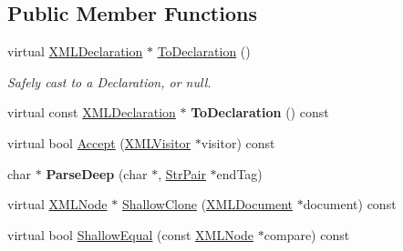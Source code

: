 \subsection*{Public Member Functions}
\begin{DoxyCompactItemize}
\item 
\hypertarget{classtinyxml2_1_1_x_m_l_declaration_a159d8ac45865215e88059ea1e5b52fc5}{virtual \hyperlink{classtinyxml2_1_1_x_m_l_declaration}{X\-M\-L\-Declaration} $\ast$ \hyperlink{classtinyxml2_1_1_x_m_l_declaration_a159d8ac45865215e88059ea1e5b52fc5}{To\-Declaration} ()}\label{classtinyxml2_1_1_x_m_l_declaration_a159d8ac45865215e88059ea1e5b52fc5}

\begin{DoxyCompactList}\small\item\em Safely cast to a Declaration, or null. \end{DoxyCompactList}\item 
\hypertarget{classtinyxml2_1_1_x_m_l_declaration_af724607a5fa810496fd6a21f5975a643}{virtual const \hyperlink{classtinyxml2_1_1_x_m_l_declaration}{X\-M\-L\-Declaration} $\ast$ {\bfseries To\-Declaration} () const }\label{classtinyxml2_1_1_x_m_l_declaration_af724607a5fa810496fd6a21f5975a643}

\item 
virtual bool \hyperlink{classtinyxml2_1_1_x_m_l_declaration_a953a7359cc312d15218eb5843a4ca108}{Accept} (\hyperlink{classtinyxml2_1_1_x_m_l_visitor}{X\-M\-L\-Visitor} $\ast$visitor) const 
\item 
\hypertarget{classtinyxml2_1_1_x_m_l_declaration_a19e33e0a9f9500f449261558c36f9a44}{char $\ast$ {\bfseries Parse\-Deep} (char $\ast$, \hyperlink{classtinyxml2_1_1_str_pair}{Str\-Pair} $\ast$end\-Tag)}\label{classtinyxml2_1_1_x_m_l_declaration_a19e33e0a9f9500f449261558c36f9a44}

\item 
virtual \hyperlink{classtinyxml2_1_1_x_m_l_node}{X\-M\-L\-Node} $\ast$ \hyperlink{classtinyxml2_1_1_x_m_l_declaration_a39458732ee6796cfc85dd35d3c488e0b}{Shallow\-Clone} (\hyperlink{classtinyxml2_1_1_x_m_l_document}{X\-M\-L\-Document} $\ast$document) const 
\item 
virtual bool \hyperlink{classtinyxml2_1_1_x_m_l_declaration_ace0d2d9bc1b63278bd5e984ebe0c7bd0}{Shallow\-Equal} (const \hyperlink{classtinyxml2_1_1_x_m_l_node}{X\-M\-L\-Node} $\ast$compare) const 
\end{DoxyCompactItemize}
